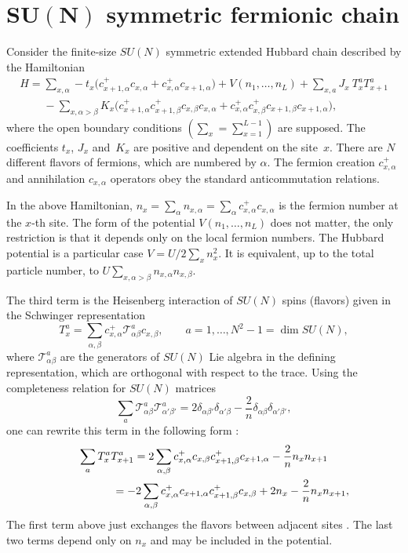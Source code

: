 \documentclass[pdftex]{sigma}
\begin{document}
\section[$SU(N)$ symmetric fermionic chain]{$\boldsymbol{SU(N)}$ symmetric fermionic chain}\label{section2}

Consider the f\/inite-size $SU(N)$ symmetric extended Hubbard chain described by the Hamiltonian
\begin{gather}
H=\sum_{x,\alpha} -t_x\big( c^+_{x+1,\alpha}c_{x,\alpha} + c^+_{x,\alpha}c_{x+1,\alpha}\big)
+  V(n_1,\dots,n_L) + \sum_{x,a} J_x\ T_x^a  T_{x+1}^a\nonumber
\\
\phantom{H=}{}- \sum_{x,\alpha>\beta} K_x\big(
c^+_{x+1,\alpha} c^+_{x+1,\beta} c_{x,\beta} c_{x,\alpha}
+ c^+_{x,\alpha} c^+_{x,\beta} c_{x+1,\beta} c_{x+1,\alpha}\big),\label{H}
\end{gather}
where the open boundary conditions $\left(\sum_x=\sum_{x=1}^{L-1}\right)$ are supposed.
The coef\/f\/icients $t_x$, $J_x$ and~$K_x$ are positive and dependent on the site~$x$.
There are $N$ dif\/ferent f\/lavors of fermions, which are numbered by $\alpha$.
The fermion  creation  $c^+_{x,\alpha}$ and annihilation  $c_{x,\alpha}$ operators
obey the standard  anticommutation relations.

In the above Hamiltonian, $n_x=\sum_{\alpha}n_{x,\alpha}=\sum_{\alpha} c^+_{x,\alpha}c_{x,\alpha}$
is the fermion number at the $x$-th site.
The form of the potential $V(n_1,\dots,n_L)$ does not matter, the
only restriction is that it depends only on the local fermion numbers.
The Hubbard potential is a particular case
$V=U/2\sum_x n_x^2$.
It is equivalent, up to the total particle number,
to $U\sum_{x,\alpha>\beta}n_{x,\alpha}n_{x,\beta}$.


The third term is the Heisenberg interaction of $SU(N)$ spins (f\/lavors) given in
the Schwinger representation
\begin{equation}
\label{schwinger}
T_x^a=\sum_{\alpha,\beta}
c_{x,\alpha}^+ \mathcal{T}^a_{\alpha\beta} c_{x,\beta}, \qquad a=1,\dots,N^2-1=\dim SU(N),
\end{equation}
where $\mathcal{T}^a_{\alpha\beta}$ are the generators of $SU(N)$ Lie
algebra in the def\/ining representation, which are  orthogonal
with respect to the trace.
 Using the completeness relation for $SU(N)$ matrices
\[
\sum_a\mathcal{T}^a_{\alpha\beta}\mathcal{T}^a_{\alpha'\beta'}=
2\delta_{\alpha\beta'} \delta_{\alpha'\beta}  -\frac{2}{n} \delta_{\alpha\beta} \delta_{\alpha'\beta'},
\]
one can rewrite this term in the following form \cite{MA89}:
\begin{gather}
\sum_{a} T_x^a  T_{x+1}^a
=
2\sum_{\alpha,\beta} c^+_{x,\alpha}  c_{x,\beta} c^+_{x+1,\beta} c_{x+1,\alpha}
- \frac{2}{n} n_x n_{x+1}\nonumber
\\
\hphantom{\sum_{a} T_x^a  T_{x+1}^a}{}=
-2\sum_{\alpha,\beta} c^+_{x,\alpha}  c_{x+1,\alpha}  c^+_{x+1,\beta} c_{x,\beta}+2n_x- \frac{2}{n} n_x n_{x+1},\label{heis}
\end{gather}
The f\/irst term above just exchanges the f\/lavors between
adjacent sites \cite{AL86}. The last two terms depend only on $n_x$ and may be included in the potential.
\end{document}

